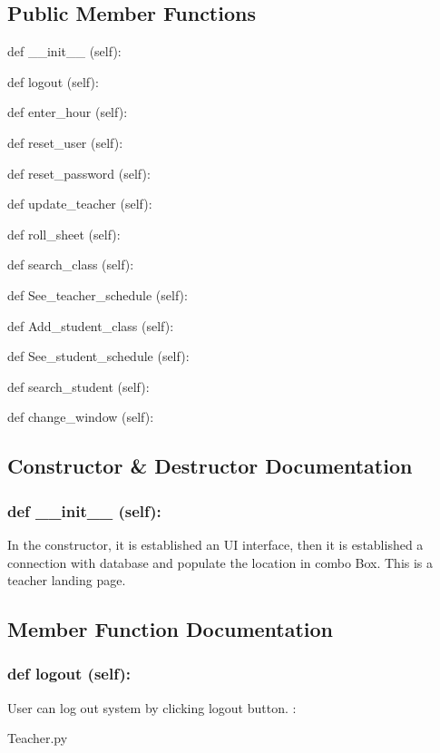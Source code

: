 \subsection*{Public Member Functions}
\begin{DoxyCompactItemize}
\item 
def {\_\_init\_\_} (self):
\item 
def {logout} (self):
\item 
def {enter\_hour} (self):
\item 
def {reset\_user} (self):
\item 
def {reset\_password} (self):
\item 
def {update\_teacher} (self):
\item 
def {roll\_sheet} (self):
\item 
def {search\_class} (self):
\item 
def {See\_teacher\_schedule} (self):
\item 
def {Add\_student\_class} (self):
\item 
def {See\_student\_schedule} (self):
\item 
def {search\_student} (self):
\item 
def {change\_window} (self):

\end{DoxyCompactItemize}

\subsection{Constructor \& Destructor Documentation}
\hypertarget{class_poly_aa3def076b74bed67904976ad4f9fe9b1}{
\subsubsection[{def __init__ (self):}]{\setlength{\rightskip}{0pt plus 5cm}def {\_\_init\_\_} (self): 
}}
In the constructor, it is established an UI interface, then it is  established a connection with database and populate the location in combo Box. This is a teacher landing page.
 

\subsection{Member Function Documentation}
\hypertarget{class_poly_a14a7ad77ce612b0c54f531d307ee4b39}{
\subsubsection[{def logout (self):}]{\setlength{\rightskip}{0pt plus 5cm}def {logout} (self):}}\label{class_poly_a14a7ad77ce612b0c54f531d307ee4b39}
User can log out system by clicking logout button.
:\begin{DoxyCompactItemize}
\item 
Teacher.\-py\end{DoxyCompactItemize}


